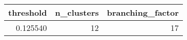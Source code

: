 \begin{tabular}{rrr}
\toprule
threshold & n_clusters & branching_factor \\
\midrule
0.125540 & 12 & 17 \\
\bottomrule
\end{tabular}
